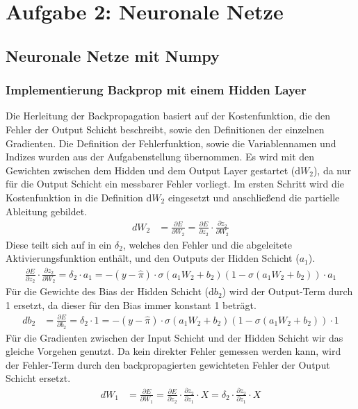 \section{Aufgabe 2: Neuronale Netze}
\subsection{Neuronale Netze mit Numpy}
\subsubsection{Implementierung Backprop mit einem Hidden Layer}
Die Herleitung der Backpropagation basiert auf der Kostenfunktion, die den Fehler der Output Schicht beschreibt, sowie den Definitionen der einzelnen Gradienten. Die Definition der Fehlerfunktion, sowie die Variablennamen und Indizes wurden aus der Aufgabenstellung übernommen. Es wird mit den Gewichten zwischen dem Hidden und dem Output Layer gestartet (d$W_{2}$), da nur für die Output Schicht ein messbarer Fehler vorliegt. Im ersten Schritt wird die Kostenfunktion in die  Definition d$W_{2}$ eingesetzt und anschließend die partielle Ableitung gebildet.
\begin{align*}
dW_{2} &= \frac{\partial E}{\partial W_{2}}
= \frac{\partial E}{\partial z_{2}}\cdot \frac{\partial z_{2}}{\partial W_{2}}
\end{align*}
Diese teilt sich auf in ein $\delta_{2}$, welches den Fehler und die abgeleitete Aktivierungsfunktion enthält, und den Outputs der Hidden Schicht ($a_{1}$).
\begin{align*}
\frac{\partial E}{\partial z_{2}}\cdot \frac{\partial z_{2}}{\partial W_{2}} = \delta_{2} \cdot a_{1}= -(y-\hat{\pi}) \cdot \sigma(a_{1}W_{2}+b_{2})(1-\sigma(a_{1}W_{2}+b_{2}))\cdot a_{1}
\end{align*}
Für die Gewichte des Bias der Hidden Schicht (d$b_{2}$) wird der Output-Term durch 1 ersetzt, da dieser für den Bias immer konstant 1 beträgt.
\begin{align*}
db_{2} &= \frac{\partial E}{\partial b_{2}}
= \delta_{2} \cdot 1 = -(y-\hat{\pi}) \cdot \sigma(a_{1}W_{2}+b_{2})(1-\sigma(a_{1}W_{2}+b_{2})) \cdot 1
\end{align*}
Für die Gradienten zwischen der Input Schicht und der Hidden Schicht wir das gleiche Vorgehen genutzt. Da kein direkter Fehler gemessen werden kann, wird der Fehler-Term durch den backpropagierten gewichteten Fehler der Output Schicht ersetzt.
\begin{align*}
dW_{1} &= \frac{\partial E}{\partial W_{1}}
= \frac{\partial E}{\partial z_{2}}\cdot \frac{\partial z_{2}}{\partial z_{1}} \cdot X = \delta_{2} \cdot \frac{\partial z_{2}}{\partial z_{1}} \cdot X
\end{align*}

